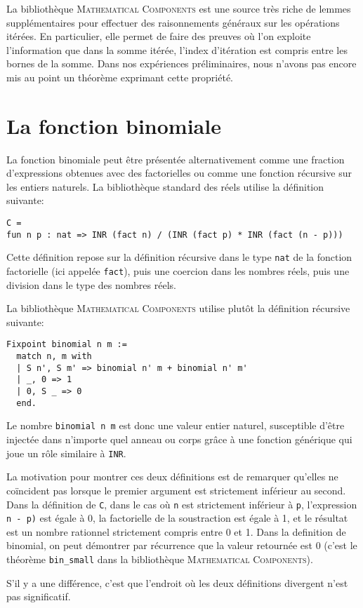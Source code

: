 \documentclass{jflart}
\newcommand{\mathcomp}{\textsc{Mathematical Components}}
\begin{document}
La bibliothèque \mathcomp{} est une source très riche de lemmes
supplémentaires pour effectuer des raisonnements généraux sur les
opérations itérées.  En particulier, elle permet de faire des preuves
où l'on exploite l'information que dans la somme itérée, l'index
d'itération est compris entre les bornes de la somme.  Dans nos
expériences préliminaires, nous n'avons pas encore mis au point un
théorème exprimant cette propriété.


\section{La fonction binomiale}
La fonction binomiale peut être présentée alternativement comme une fraction
d'expressions obtenues avec des factorielles ou comme une
fonction récursive sur les entiers naturels.  La bibliothèque
standard des réels utilise la définition suivante:
\begin{verbatim}
C =
fun n p : nat => INR (fact n) / (INR (fact p) * INR (fact (n - p)))
\end{verbatim}
Cette définition repose sur la définition récursive dans le type 
\texttt{nat} de la fonction factorielle (ici appelée \texttt{fact}), puis
une coercion dans les nombres réels, puis une division dans le type
des nombres réels.

La bibliothèque \mathcomp{} utilise plutôt la définition récursive suivante:
\begin{verbatim}
Fixpoint binomial n m :=
  match n, m with
  | S n', S m' => binomial n' m + binomial n' m'
  | _, 0 => 1
  | 0, S _ => 0
  end.
\end{verbatim}
Le nombre \texttt{binomial n m} est donc une valeur entier naturel, susceptible
d'être injectée dans n'importe quel anneau ou corps grâce à une
fonction générique qui joue un rôle similaire à \texttt{INR}.

La motivation pour montrer ces deux définitions est de remarquer
qu'elles ne coïncident pas lorsque le premier argument est strictement
inférieur au second.   Dans la définition de \texttt{C},  dans le cas où
\texttt{n}  est strictement inférieur à \texttt{p}, l'expression \texttt{n -
  p)} est égale à 0, la
factorielle de la soustraction est égale à 1, et le résultat est un
nombre rationnel strictement compris entre 0 et 1.  Dans la definition
de binomial, on peut démontrer par récurrence que la valeur retournée
est 0 (c'est le théorème \texttt{bin\_small} dans la bibliothèque
\mathcomp{}).

S'il y a une différence, c'est que l'endroit où les deux définitions
divergent n'est pas significatif.
\end{document}
